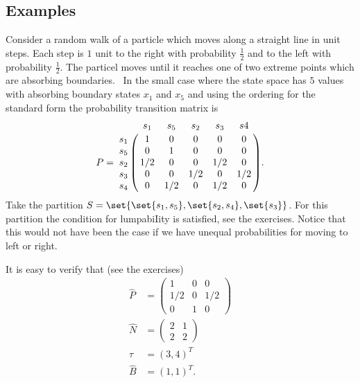 \documentclass[12pt]{article}
\begin{document}
\subsection*{Examples}

\begin{example}
    Consider a random walk%
    of a particle which moves along a straight line in unit steps.  Each
    step is \( 1 \) unit to the right with probability \( \frac{1}{2} \)
    and to the left with probability \( \frac{1}{2} \).  The particel moves until
    it reaches one of two extreme points which are absorbing
    boundaries.~%
    In the small case where the state space
    has \( 5 \) values with absorbing boundary states \( x_1 \) and \( x_5
    \) and using the ordering for the standard form the probability
    transition matrix is
    \[
        P = \bordermatrix{ & s_1 & s_5 & s_2 & s_3 & s4 \cr
        s_1 & 1 & 0 & 0 & 0 & 0 \cr
        s_5 & 0 & 1 & 0 & 0 & 0 \cr
        s_2 & 1/2 & 0 & 0 &1/2 & 0 \cr
        s_3 & 0 & 0 & 1/2 & 0 & 1/2 \cr
        s_4 & 0 & 1/2 & 0 & 1/2 & 0 \cr
        }.
    \] Take the partition \( S = \set{ \set{s_1, s_5}, \set{s_2, s_4},
    \set{s_3}} \).  For this partition the condition for lumpabiIity is
    satisfied, see the exercises.  Notice that this would not have been
    the case if we have unequal probabilities for moving to left or
    right.

    It is easy to verify that (see the exercises)
    \begin{align*}
        \hat{P} &=
        \begin{pmatrix}
            1 & 0 & 0 \\
            1/2 & 0 & 1/2 \\
            0 & 1 & 0
        \end{pmatrix}
        \\
        \hat{N} &=
        \begin{pmatrix}
            2 & 1 \\
            2 & 2
        \end{pmatrix}
        \\
        \hat{\tau} &= (3, 4)^T \\
        \hat{B} &= (1,1)^T.
    \end{align*}
\end{example}
\end{document}

